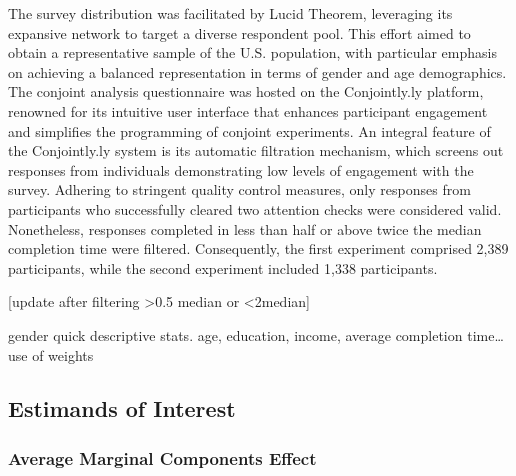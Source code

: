 \documentclass[
  12pt,
]{article}
\begin{document}
The survey distribution was facilitated by Lucid Theorem, leveraging its expansive network to target a diverse respondent pool. This effort aimed to obtain a representative sample of the U.S. population, with particular emphasis on achieving a balanced representation in terms of gender and age demographics. The conjoint analysis questionnaire was hosted on the Conjointly.ly platform, renowned for its intuitive user interface that enhances participant engagement and simplifies the programming of conjoint experiments. An integral feature of the Conjointly.ly system is its automatic filtration mechanism, which screens out responses from individuals demonstrating low levels of engagement with the survey. Adhering to stringent quality control measures, only responses from participants who successfully cleared two attention checks were considered valid. Nonetheless, responses completed in less than half or above twice the median completion time were filtered. Consequently, the first experiment comprised 2,389 participants, while the second experiment included 1,338 participants.

{[}update after filtering \textgreater0.5 median or \textless2median{]}

gender quick descriptive stats. age, education, income, average completion time\ldots{} use of weights

\hypertarget{estimands-of-interest}{%
\subsection{Estimands of Interest}\label{estimands-of-interest}}

\hypertarget{average-marginal-components-effect}{%
\subsubsection{Average Marginal Components Effect}\label{average-marginal-components-effect}}
\end{document}
